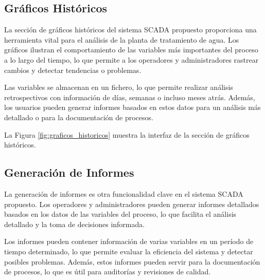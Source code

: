 \begin{figure}[h!]
    \centering
\end{figure}


\subsection{Gráficos Históricos}

La sección de gráficos históricos del sistema SCADA propuesto proporciona una herramienta vital para el análisis de la planta de tratamiento de agua. Los gráficos ilustran el comportamiento de las variables más importantes del proceso a lo largo del tiempo, lo que permite a los operadores y administradores rastrear cambios y detectar tendencias o problemas.

Las variables se almacenan en un fichero, lo que permite realizar análisis retrospectivos con información de días, semanas o incluso meses atrás. Además, los usuarios pueden generar informes basados en estos datos para un análisis más detallado o para la documentación de procesos.

La Figura \ref{fig:graficos_historicos} muestra la interfaz de la sección de gráficos históricos.

\begin{figure}[h!]
    \centering
\end{figure}

\subsection{Generación de Informes}

La generación de informes es otra funcionalidad clave en el sistema SCADA propuesto. Los operadores y administradores pueden generar informes detallados basados en los datos de las variables del proceso, lo que facilita el análisis detallado y la toma de decisiones informada.

Los informes pueden contener información de varias variables en un período de tiempo determinado, lo que permite evaluar la eficiencia del sistema y detectar posibles problemas. Además, estos informes pueden servir para la documentación de procesos, lo que es útil para auditorías y revisiones de calidad.

